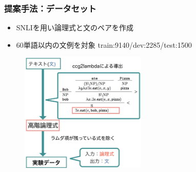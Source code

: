 \documentclass[dvipdfmx,cjk]{beamer}
\begin{document}
\begin{frame}
\frametitle{提案手法：データセット}
\begin{itemize}
  \item
SNLIを用い論理式と文のペアを作成

\item 60単語以内の文例を対象
train:9140/dev:2285/test:1500\\

\end{itemize}
\begin{center}
\begin{figure}[h]
	\includegraphics[width=6cm]{edit_data.png}
        \label{fig:editdata}
\end{figure}
\end{center}

\end{frame}
\end{document}
